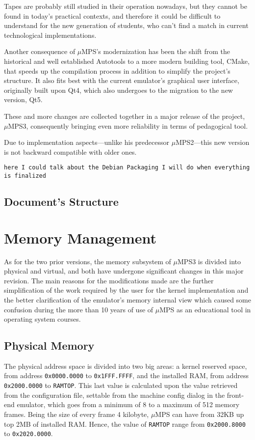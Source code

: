 \documentclass[12pt,a4paper,openright,twoside]{report}
\begin{document}
	Tapes are probably still studied in their operation nowadays, but they cannot be found in today's practical contexts, and therefore it could be difficult to understand for the new generation of students, who can't find a match in current technological implementations.
	
	Another consequence of $\mu$MPS's modernization has been the shift from the historical and well established Autotools to a more modern building tool, CMake, that speeds up the compilation process in addition to simplify the project's structure.
	It also fits best with the current emulator's graphical user interface, originally built upon Qt4, which also undergoes to the migration to the new version, Qt5.
	
	These and more changes are collected together in a major release of the project, $\mu$MPS3, consequently bringing even more reliability in terms of pedagogical tool.
	
	Due to implementation aspects---unlike his predecessor $\mu$MPS2---this new version is not backward compatible with older ones.

	\texttt{here I could talk about the Debian Packaging I will do when everything is finalized}
\section{Document's Structure}
\chapter{Memory Management}
\lhead[\fancyplain{}{\bfseries\thepage}]{\fancyplain{}{\bfseries\rightmark}}
	As for the two prior versions, the memory subsystem of $\mu$MPS3 is divided into physical and virtual, and both have undergone significant changes in this major revision.
	The main reasons for the modifications made are the further simplification of the work required by the user for the kernel implementation and the better clarification of the emulator's memory internal view which caused some confusion during the more than 10 years of use of $\mu$MPS as an educational tool in operating system courses.

\section{Physical Memory}
	The physical address space is divided into two big areas: a kernel reserved space, from address \texttt{0x0000.0000} to \texttt{0x1FFF.FFFF}, and the installed RAM, from address \texttt{0x2000.0000} to \texttt{RAMTOP}.
	This last value is calculated upon the value retrieved from the configuration file, settable from the machine config dialog in the front-end emulator, which goes from a minimum of 8 to a maximum of 512 memory frames.
	Being the size of every frame 4 kilobyte, $\mu$MPS can have from 32KB up top 2MB of installed RAM. Hence, the value of \texttt{RAMTOP} range from \texttt{0x2000.8000} to \texttt{0x2020.0000}.
\end{document}

